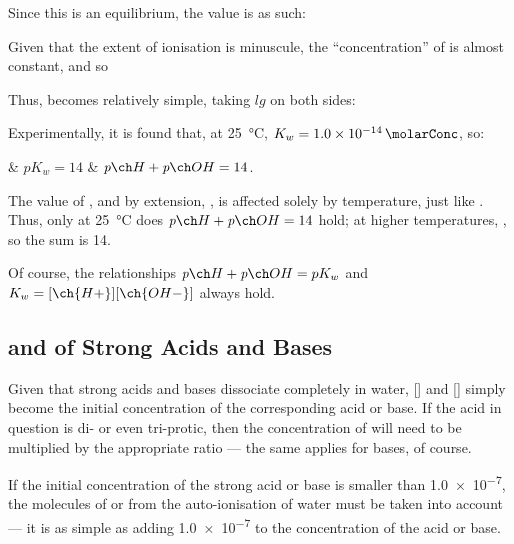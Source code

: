 			Since this is an equilibrium, the \Kc{} value is as such:

			\eqndiagram{
				\[ K_{c} = \frac{[\ch{H+}][\ch{OH-}]}{[\ch{H2O}]} \]
			}

			Given that the extent of ionisation is minuscule, the \enquote{concentration} of  is almost constant, and so

			\eqndiagram{
				\[ K_{w} = K_{c} \times [\ch{H2O}] = [\ch{H+}][\ch{OH-}] \]
			}

			Thus, \pKw{} becomes relatively simple, taking $lg$ on both sides:


			Experimentally, it is found that, at \SI{25}{\celsius}, $K_{w} = \SI{1.0e-14}{\molarConc}$, so:
			\begin{bulletlist}
				& $pK_{w} = 14$
				& $\MpH + \MpOH = 14$.
			\end{bulletlist}

			The value of \Kw{}, and by extension, \pKw{}, is affected solely by temperature, just like \Kc{}. Thus, only at \SI{25}{\celsius}
			does $\MpH + \MpOH = 14$ hold; at higher temperatures, \Kw{} , so the sum is  \num{14}.

			Of course, the relationships $\MpH + \MpOH = pK_{w}$ and $K_{w} = [\ch{H+}][\ch{OH-}]$ always hold.


		\subsection{\texorpdfstring{\pH{}}{pH} and \texorpdfstring{\pOH{}}{pOH} of Strong Acids and Bases}

			Given that strong acids and bases dissociate completely in water, [] and [] simply become the initial concentration
			of the corresponding acid or base. If the acid in question is di- or even tri-protic, then the concentration of  will need
			to be multiplied by the appropriate ratio --- the same applies for bases, of course.

			If the initial concentration of the strong acid or base is smaller than \SI{1.0e-7}{\molarConc},
			the molecules of  or  from the auto-ionisation of water must be taken into account --- it is as simple as adding
			\num{1.0e-7} to the concentration of the acid or base.


